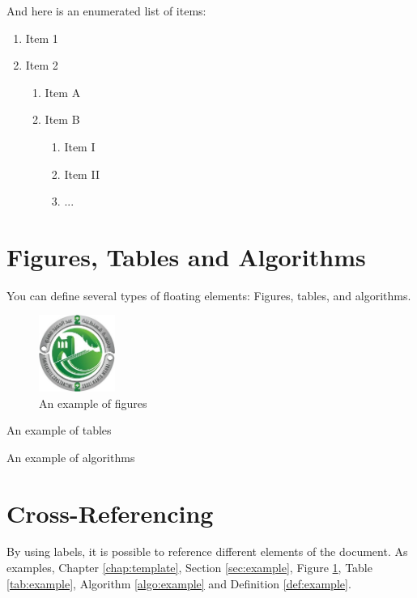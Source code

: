 \noindent
And here is an enumerated list of items:

\begin{enumerate}
	\item Item 1	
	\item Item 2
	\begin{enumerate}
		\item Item A
		\item Item B
		\begin{enumerate}
			\item Item I
			\item Item II
			\item ...
		\end{enumerate}
	\end{enumerate}
\end{enumerate}

\section{Figures, Tables and Algorithms}
You can define several types of floating elements: Figures, tables, and algorithms.

\begin{figure}[h]
	\centering
	\includegraphics[width=2.5cm]{front/logo-uc2}
	\caption{An example of figures}
	\label{fig:example} %
\end{figure}

\begin{table}[h]
	\centering
	\caption{An example of tables}
	
	\label{tab:example} %
\end{table}

\begin{algorithm}[h] 
	
	\caption{An example of algorithms}
	\label{algo:example} %
\end{algorithm}

\section{Cross-Referencing}

By using labels, it is possible to reference different elements of the document. As examples, Chapter \ref{chap:template}, Section \ref{sec:example}, Figure \ref{fig:example}, Table \ref{tab:example}, Algorithm \ref{algo:example} and Definition \ref{def:example}.


